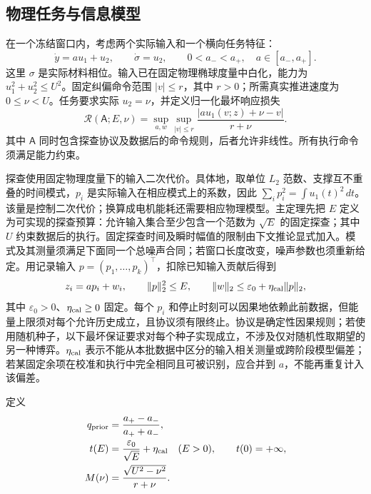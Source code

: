\documentclass[11pt,a4paper]{article}
\numberwithin{equation}{section}
\theoremstyle{definition}
\begin{document}
\subsection{物理任务与信息模型}
在一个冻结窗口内，考虑两个实际输入和一个横向任务特征：
\begin{equation}
 \dot y=a u_1+u_2,\qquad \dot\sigma=u_2,
 \qquad 0<a_-<a_+,\quad a\in[a_-,a_+].
 \label{eq:v44:scalar-plant}
\end{equation}
这里 $\sigma$ 是实际材料相位。输入已在固定物理椭球度量中白化，能力为 $u_1^2+u_2^2\le U^2$。固定纠偏命令范围 $|v|\le r$，其中 $r>0$；所需真实推进速度为 $0\le\nu<U$。任务要求实际 $u_2=\nu$，并定义归一化最坏响应损失
\begin{equation}
 \mathcal R(\mathsf A;E,\nu)
 =\sup_{a,w}\sup_{|v|\le r}
 \frac{|a u_1(v;z)+\nu-v|}{r+\nu}.
 \label{eq:v44:scalar-risk}
\end{equation}
其中 $\mathsf A$ 同时包含探查协议及数据后的命令规则，后者允许非线性。所有执行命令须满足能力约束。

探查使用固定物理度量下的输入二次代价。具体地，取单位 $L_2$ 范数、支撑互不重叠的时间模式，$p_i$ 是实际输入在相应模式上的系数，因此 $\sum_i p_i^2=\int u_1(t)^2\,dt$。该量是控制二次代价；换算成电机能耗还需要相应物理模型。主定理先把 $E$ 定义为可实现的探查预算：允许输入集合至少包含一个范数为 $\sqrt E$ 的固定探查；其中 $U$ 约束数据后的执行。固定探查时间及瞬时幅值的限制由下文推论显式加入。模式及其测量须满足下面同一个总噪声合同；若窗口长度改变，噪声参数也须重新给定。用记录输入 $p=(p_1,\ldots,p_k)^\top$，扣除已知输入贡献后得到
\begin{equation}
 z_i=a p_i+w_i,\qquad
 \|p\|_2^2\le E,\qquad
 \|w\|_2\le\varepsilon_0+\eta_{\rm cal}\|p\|_2,
 \label{eq:v44:scalar-data}
\end{equation}
其中 $\varepsilon_0>0$、$\eta_{\rm cal}\ge0$ 固定。每个 $p_i$ 和停止时刻可以因果地依赖此前数据，但能量上限须对每个允许历史成立，且协议须有限终止。协议是确定性因果规则；若使用随机种子，以下最坏保证要求对每个种子实现成立，不涉及仅对随机性取期望的另一种博弈。$\eta_{\rm cal}$ 表示不能从本批数据中区分的输入相关测量或跨阶段模型偏差；若某固定余项在校准和执行中完全相同且可被识别，应合并到 $a$，不能再重复计入该偏差。

定义
\begin{align}
 q_{\rm prior}&=\frac{a_+-a_-}{a_++a_-},\\
 t(E)&=\frac{\varepsilon_0}{\sqrt E}+\eta_{\rm cal}\quad(E>0),
 \qquad t(0)=+\infty,\\
 M(\nu)&=\frac{\sqrt{U^2-\nu^2}}{r+\nu}.
\end{align}
\end{document}
